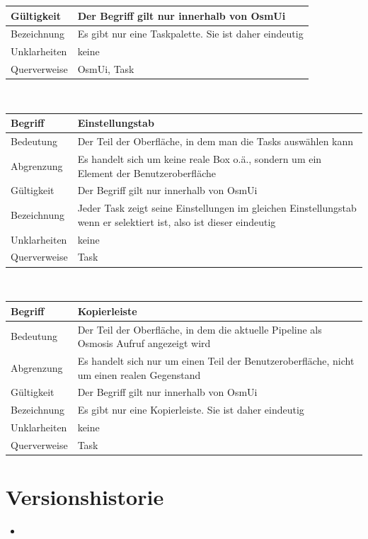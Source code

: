 \documentclass[a4paper,12pt]{scrartcl}
\begin{document}
\begin{center}
\begin{tabular}{|p{5cm}|p{10cm}|}
\hline Gültigkeit & Der Begriff gilt nur innerhalb von OsmUi \\ 
\hline Bezeichnung & Es gibt nur eine Taskpalette. Sie ist daher eindeutig \\ 
\hline Unklarheiten & keine \\ 
\hline Querverweise & OsmUi, Task\\ 
\hline 
\end{tabular}
\vspace{0.7cm}
\\
\begin{tabular}{|p{5cm}|p{10cm}|}
\hline Begriff & \textbf{Einstellungstab} \\ 
\hline Bedeutung & Der Teil der Oberfläche, in dem man die Tasks auswählen kann  \\ 
\hline Abgrenzung & Es handelt sich um keine reale Box o.ä., sondern um ein Element der Benutzeroberfläche\\ 
\hline Gültigkeit & Der Begriff gilt nur innerhalb von OsmUi \\ 
\hline Bezeichnung & Jeder Task zeigt seine Einstellungen im gleichen Einstellungstab wenn er selektiert ist, also ist dieser eindeutig \\ 
\hline Unklarheiten & keine \\ 
\hline Querverweise & Task \\ 
\hline 
\end{tabular}
\vspace{0.7cm}
\\
\begin{tabular}{|p{5cm}|p{10cm}|}
\hline Begriff & \textbf{Kopierleiste} \\ 
\hline Bedeutung & Der Teil der Oberfläche, in dem die aktuelle Pipeline als Osmosis Aufruf angezeigt wird \\ 
\hline Abgrenzung & Es handelt sich nur um einen Teil der Benutzeroberfläche, nicht um einen realen Gegenstand \\ 
\hline Gültigkeit & Der Begriff gilt nur innerhalb von OsmUi \\ 
\hline Bezeichnung & Es gibt nur eine Kopierleiste. Sie ist daher eindeutig \\ 
\hline Unklarheiten & keine \\ 
\hline Querverweise & Task \\ 
\hline 
\end{tabular}
\end{center}
\section{Versionshistorie}
\begin{itemize}
\item 
\end{itemize}
\end{document}
